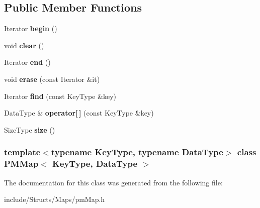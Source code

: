 \subsection*{Public Member Functions}
\begin{DoxyCompactItemize}
\item 
\hypertarget{class_p_m_map_afaa90856ad78923e1548662831124573}{
Iterator {\bfseries begin} ()}
\label{class_p_m_map_afaa90856ad78923e1548662831124573}

\item 
\hypertarget{class_p_m_map_a62fd933360d35a3c73e79abf1e3fc231}{
void {\bfseries clear} ()}
\label{class_p_m_map_a62fd933360d35a3c73e79abf1e3fc231}

\item 
\hypertarget{class_p_m_map_a3dc7e58baf6d56049d811a89410916d0}{
Iterator {\bfseries end} ()}
\label{class_p_m_map_a3dc7e58baf6d56049d811a89410916d0}

\item 
\hypertarget{class_p_m_map_ae729d0e25a6576d23b9231ccdcfb5fab}{
void {\bfseries erase} (const Iterator \&it)}
\label{class_p_m_map_ae729d0e25a6576d23b9231ccdcfb5fab}

\item 
\hypertarget{class_p_m_map_a4ea9580597bd7b35bd3d058d908be078}{
Iterator {\bfseries find} (const KeyType \&key)}
\label{class_p_m_map_a4ea9580597bd7b35bd3d058d908be078}

\item 
\hypertarget{class_p_m_map_a7713f0adeb0d2034e128c53da8ee93ab}{
DataType \& {\bfseries operator\mbox{[}$\,$\mbox{]}} (const KeyType \&key)}
\label{class_p_m_map_a7713f0adeb0d2034e128c53da8ee93ab}

\item 
\hypertarget{class_p_m_map_ae56c50e38db5b5a4a867c9150e559cc9}{
SizeType {\bfseries size} ()}
\label{class_p_m_map_ae56c50e38db5b5a4a867c9150e559cc9}

\end{DoxyCompactItemize}
\subsubsection*{template$<$typename KeyType, typename DataType$>$ class PMMap$<$ KeyType, DataType $>$}



The documentation for this class was generated from the following file:\begin{DoxyCompactItemize}
\item 
include/Structs/Maps/pmMap.h\end{DoxyCompactItemize}

